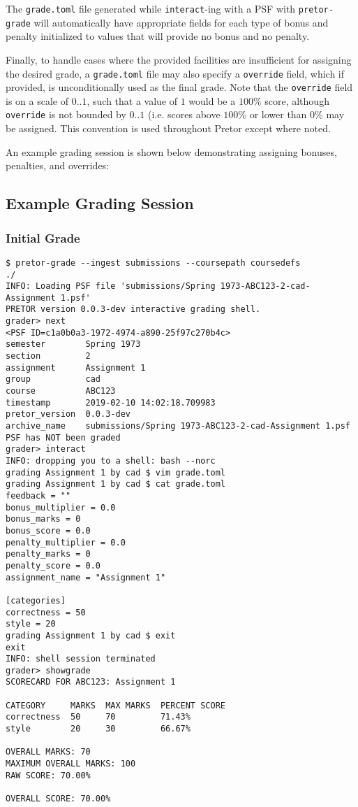 \documentclass{book}
\begin{document}
The \texttt{grade.toml} file generated while \texttt{interact}-ing with a PSF
with \texttt{pretor-grade} will automatically have appropriate fields for each
type of bonus and penalty initialized to values that will provide no bonus and
no penalty.

Finally, to handle cases where the provided facilities are insufficient for
assigning the desired grade, a \texttt{grade.toml} file may also specify a
\texttt{override} field, which if provided, is unconditionally used as the
final grade. Note that the \texttt{override} field is on a scale of $0..1$,
such that a value of $1$ would be a $100\%$ score, although \texttt{override}
is not bounded by $0..1$ (i.e. scores above $100\%$ or lower than $0\%$ may be
assigned. This convention is used throughout Pretor except where noted.


An example grading session is shown below demonstrating assigning bonuses,
penalties, and overrides:

\subsection{Example Grading Session}

\subsubsection{Initial Grade}

\begin{verbatim}
$ pretor-grade --ingest submissions --coursepath coursedefs
./
INFO: Loading PSF file 'submissions/Spring 1973-ABC123-2-cad-Assignment 1.psf'
PRETOR version 0.0.3-dev interactive grading shell.
grader> next
<PSF ID=c1a0b0a3-1972-4974-a890-25f97c270b4c>
semester        Spring 1973
section         2
assignment      Assignment 1
group           cad
course          ABC123
timestamp       2019-02-10 14:02:18.709983
pretor_version  0.0.3-dev
archive_name    submissions/Spring 1973-ABC123-2-cad-Assignment 1.psf
PSF has NOT been graded
grader> interact
INFO: dropping you to a shell: bash --norc
grading Assignment 1 by cad $ vim grade.toml
grading Assignment 1 by cad $ cat grade.toml
feedback = ""
bonus_multiplier = 0.0
bonus_marks = 0
bonus_score = 0.0
penalty_multiplier = 0.0
penalty_marks = 0
penalty_score = 0.0
assignment_name = "Assignment 1"

[categories]
correctness = 50
style = 20
grading Assignment 1 by cad $ exit
exit
INFO: shell session terminated
grader> showgrade
SCORECARD FOR ABC123: Assignment 1

CATEGORY     MARKS  MAX MARKS  PERCENT SCORE
correctness  50     70         71.43%
style        20     30         66.67%

OVERALL MARKS: 70
MAXIMUM OVERALL MARKS: 100
RAW SCORE: 70.00%

OVERALL SCORE: 70.00%
\end{verbatim}
\end{document}
